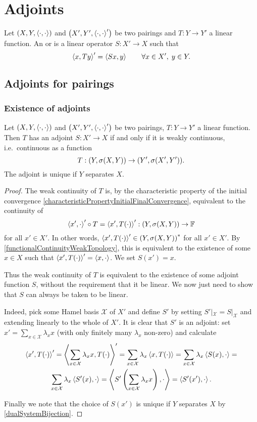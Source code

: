 \section{Adjoints}
\begin{definition}
Let $\sSet{X,Y,\pair{\cdot,\cdot}}$ and $\sSet{X',Y',\pair{\cdot,\cdot}'}$ be two pairings and $T: Y\to Y'$ a linear function. An  or  is a linear operator $S: X'\to X$ such that
\[ \left\langle x, Ty \right\rangle' = \left\langle Sx, y \right\rangle \qquad \forall x\in X', \; y\in Y. \]
\end{definition}

\subsection{Adjoints for pairings}
\subsubsection{Existence of adjoints}
\begin{proposition} \label{existenceAdjointWeaklyContinuousFunction}
Let $\sSet{X,Y,\pair{\cdot,\cdot}}$ and $\sSet{X',Y',\pair{\cdot,\cdot}'}$ be two pairings, $T: Y\to Y'$ a linear function. Then $T$ has an adjoint $S: X'\to X$ \textup{if and only if} it is weakly continuous, i.e.\ continuous as a function
\[ T: \sSet{Y, \sigma(X,Y)} \to \sSet{Y', \sigma(X',Y')}. \]
The adjoint is unique if $Y$ separates $X$.
\end{proposition}
\begin{proof}
The weak continuity of $T$ is, by the characteristic property of the initial convergence \ref{characteristicPropertyInitialFinalConvergence}, equivalent to the continuity of
\[ \pair{x', \cdot}' \circ T = \pair{x', T(\cdot)}' : \sSet{Y, \sigma(X,Y)} \to \F \]
for all $x'\in X'$. In other words, $\pair{x', T(\cdot)}' \in \dual{\sSet{Y, \sigma(X,Y)}}$ for all $x'\in X'$. By \ref{functionalContinuityWeakTopology}, this is equivalent to the existence of some $x\in X$ such that $\left\langle x', T(\cdot) \right\rangle' = \left\langle x,\cdot \right\rangle$. We set $S(x') = x$.

Thus the weak continuity of $T$ is equivalent to the existence of some adjoint function $S$, without the requirement that it be linear. We now just need to show that $S$ can always be taken to be linear.

Indeed, pick some Hamel basis $\mathcal{X}$ of $X'$ and define $S'$ by setting $S'|_{\mathcal{X}} = S|_{\mathcal{X}}$ and extending linearly to the whole of $X'$. It is clear that $S'$ is an adjoint: set $x' = \sum_{x\in\mathcal{X}}\lambda_x x$ (with only finitely many $\lambda_x$ non-zero) and calculate
\begin{multline*}
\left\langle x', T(\cdot) \right\rangle' = \left\langle \sum_{x\in\mathcal{X}}\lambda_x x, T(\cdot) \right\rangle' = \sum_{x\in\mathcal{X}}\lambda_x \left\langle x, T(\cdot) \right\rangle = \sum_{x\in\mathcal{X}}\lambda_x \left\langle S(x), \cdot \right\rangle = \\ \sum_{x\in\mathcal{X}}\lambda_x \left\langle S'(x), \cdot \right\rangle = \left\langle S'\left(\sum_{x\in\mathcal{X}}\lambda_x x\right), \cdot \right\rangle = \left\langle S'(x'), \cdot \right\rangle.
\end{multline*}

Finally we note that the choice of $S(x')$ is unique if $Y$ separates $X$ by \ref{dualSystemBijection}.
\end{proof}
